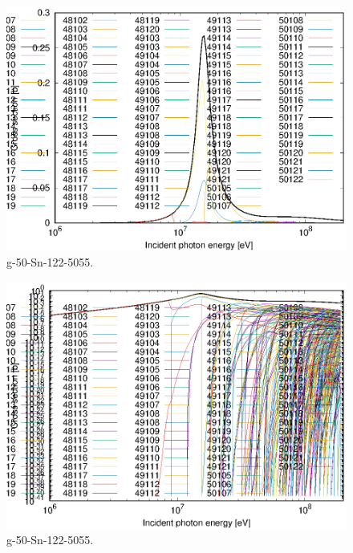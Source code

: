 \begin{figure}
 \includegraphics[width=\linewidth]{eps/g_50-Sn-122_5055.eps}
  \caption{g-50-Sn-122-5055.}
\end{figure}
\begin{figure}
 \includegraphics[width=\linewidth]{eps-log/g_50-Sn-122_5055.eps}
 \caption{g-50-Sn-122-5055.}
\end{figure}
\newpage \clearpage

